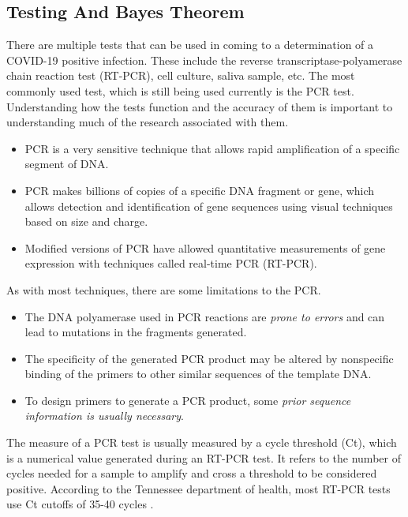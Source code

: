 \documentclass[10pt, a4paper, twocolumn]{book}
\begin{document}
\subsection{Testing And Bayes Theorem}

There are multiple tests that can be used in coming to a determination of a COVID-19 positive infection. These include the reverse transcriptase-polyamerase chain reaction test (RT-PCR), cell culture, saliva sample, etc. The most commonly used test, which is still being used currently is the PCR test. Understanding how the tests function and the accuracy of them is important to understanding much of the research associated with them.

\begin{itemize}
	\item PCR is a very sensitive technique that allows rapid amplification of a specific segment of DNA.
	\item PCR makes billions of copies of a specific DNA fragment or gene, which allows detection and identification of gene sequences using visual techniques based on size and charge.
	\item Modified versions of PCR have allowed quantitative measurements of gene expression with techniques called real-time PCR (RT-PCR).
\end{itemize}

As with most techniques, there are some limitations to the PCR.

\begin{itemize}
	\item The DNA polyamerase used in PCR reactions are \textit{prone to errors} and can lead to mutations in the fragments generated.
	\item The specificity of the generated PCR product may be altered by nonspecific binding of the primers to other similar sequences of the template DNA.
	\item To design primers to generate a PCR product, some \textit{prior sequence information is usually necessary}.
\end{itemize}

The measure of a PCR test is usually measured by a cycle threshold (Ct), which is a numerical value generated during an RT-PCR test. It refers to the number of cycles needed for a sample to amplify and cross a threshold to be considered positive. According to the Tennessee department of health, most RT-PCR tests use Ct cutoffs of 35-40 cycles \citep{PCRCtValues}. 
\end{document}
